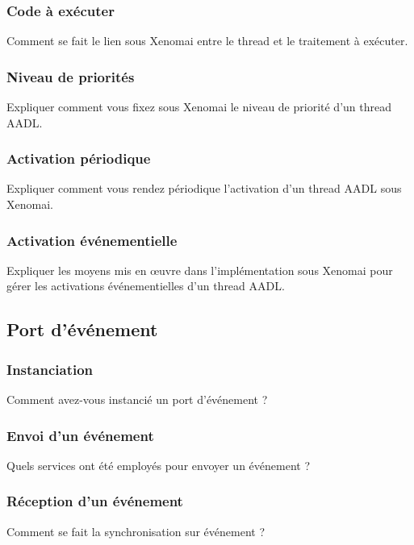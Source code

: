 \documentclass[11pt, a4paper]{paper}
\begin{document}
\subsubsection{Code à exécuter}
 {\color{blue} Comment se fait le lien sous Xenomai entre le thread et le traitement à exécuter.}

\subsubsection{Niveau de priorités}
 {\color{blue} Expliquer comment vous fixez sous Xenomai le niveau de priorité d'un thread AADL.}

\subsubsection{Activation périodique}
 {\color{blue} Expliquer comment vous rendez périodique l'activation d'un thread AADL sous Xenomai.}

\subsubsection{Activation événementielle}
 {\color{blue} Expliquer les moyens mis en {\oe}uvre dans l'implémentation sous Xenomai pour gérer les activations événementielles d'un thread AADL.}

\subsection{Port d’événement}

\subsubsection{Instanciation}
 {\color{blue} Comment avez-vous instancié un port d'événement ?}

\subsubsection{Envoi d’un événement}
 {\color{blue} Quels services ont été employés pour envoyer un événement ?}

\subsubsection{Réception d’un événement}
 {\color{blue} Comment se fait la synchronisation sur événement ?}
\end{document}

